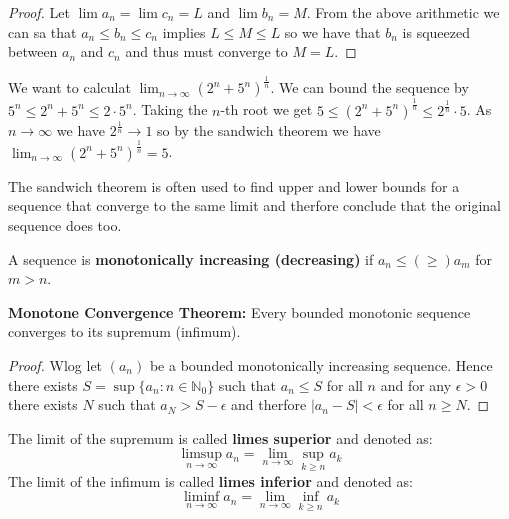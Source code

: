 \begin{proof}
    Let $\lim a_n = \lim c_n = L$ and $\lim b_n = M$. From the above arithmetic we can sa that $a_n \leq b_n \leq c_n$ implies $L \leq M \leq L$ so we have that $b_n$ is squeezed between $a_n$ and $c_n$ and thus must converge to $M = L$.
\end{proof}

\begin{example}
    We want to calculat $\lim_{n \to \infty} (2^n + 5^n)^\frac{1}{n}$.
    We can bound the sequence by $5^n \leq 2^n + 5^n \leq 2 \cdot 5^n$.
    Taking the $n$-th root we get $5 \leq (2^n + 5^n)^\frac{1}{n} \leq 2^\frac{1}{n} \cdot 5$.
    As $n \to \infty$ we have $2^\frac{1}{n} \to 1$ so by the sandwich theorem we have $\lim_{n \to \infty} (2^n + 5^n)^\frac{1}{n} = 5$.
\end{example}

\begin{remark}
    The sandwich theorem is often used to find upper and lower bounds for a sequence that converge to the same limit and therfore conclude that the original sequence does too.
\end{remark}

\begin{definition}
    A sequence is \textbf{monotonically increasing (decreasing)} if $a_n \le (\geq) a_m$ for $m \gt n$.
\end{definition}

\begin{theorem}
    \textbf{Monotone Convergence Theorem:} Every bounded monotonic sequence converges to its supremum (infimum).
\end{theorem}

\begin{proof}
    Wlog let $(a_n)$ be a bounded monotonically increasing sequence. Hence there exists $S = \sup \{a_n : n \in \mathbb{N}_0\}$ such that $a_n \le S$ for all $n$ and for any $\epsilon > 0$ there exists $N$ such that $a_N > S - \epsilon$ and therfore $|a_n - S| < \epsilon$ for all $n \ge N$.
\end{proof}

\begin{definition}
    The limit of the supremum is called \textbf{limes superior} and denoted as:
    $$\limsup_{n \to \infty} a_n = \lim_{n \to \infty} \sup_{k \ge n} a_k$$
    The limit of the infimum is called \textbf{limes inferior} and denoted as:
    $$\liminf_{n \to \infty} a_n = \lim_{n \to \infty} \inf_{k \ge n} a_k$$
\end{definition}

